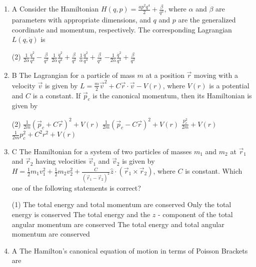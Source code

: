 \begin{enumerate}
	{}
	\item A Consider the Hamiltonian $H(q, p)=\frac{a p^{2} q^{4}}{2}+\frac{\beta}{q^{2}}$, where $\alpha$ and $\beta$ are parameters with appropriate dimensions, and $q$ and $p$ are the generalized coordinate and momentum, respectively. The corresponding Lagrangian $L(q, \dot{q})$ is
{}
	 \begin{tasks}(2)
		\task[\textbf{a.}] $\frac{1}{2 \alpha} \frac{\dot{q}^{2}}{q^{4}}-\frac{\beta}{q^{2}}$
		\task[\textbf{b.}]$\frac{1}{2 \alpha} \frac{\dot{q}^{2}}{q^{4}}+\frac{\beta}{q^{2}}$
		\task[\textbf{c.}]$\frac{1}{\alpha} \frac{\dot{q}^{2}}{q^{4}}+\frac{\beta}{q^{2}}$
		\task[\textbf{d.}] $-\frac{1}{2 \alpha} \frac{\dot{q}^{2}}{q^{4}}+\frac{\beta}{q^{2}}$
	\end{tasks}
	\item B The Lagrangian for a particle of mass $m$ at a position $\vec{r}$ moving with a velocity $\vec{v}$ is given by $L=\frac{m}{2} \vec{v}^{2}+C \vec{r} \cdot \vec{v}-V(r)$, where $V(r)$ is a potential and $C$ is a constant. If $\vec{p}_{c}$ is the canonical momentum, then its Hamiltonian is given by
{}
	 \begin{tasks}(2)
		\task[\textbf{a.}]$\frac{1}{2 m}\left(\vec{p}_{c}+C \vec{r}\right)^{2}+V(r)$
		\task[\textbf{b.}]$\frac{1}{2 m}\left(\vec{p}_{c}-C \vec{r}\right)^{2}+V(r)$
		\task[\textbf{c.}]$\frac{p_{c}^{2}}{2 m}+V(r)$
		\task[\textbf{d.}]  $\frac{1}{2 m} p_{c}^{2}+C^{2} r^{2}+V(r)$
	\end{tasks}
	\item C The Hamiltonian for a system of two particles of masses $m_{1}$ and $m_{2}$ at $\vec{r}_{1}$ and $\vec{r}_{2}$ having velocities $\vec{v}_{1}$ and $\vec{v}_{2}$ is given by $H=\frac{1}{2} m_{1} v_{1}^{2}+\frac{1}{2} m_{2} v_{2}^{2}+\frac{C}{\left(\vec{r}_{1}-\vec{r}_{2}\right)^{2}} \hat{z} \cdot\left(\vec{r}_{1} \times \vec{r}_{2}\right)$, where $C$ is constant. Which one of the following statements is correct?
	{}
	 \begin{tasks}(1)
		\task[\textbf{a.}] The total energy and total momentum are conserved
		\task[\textbf{b.}]Only the total energy is conserved
		\task[\textbf{c.}]The total energy and the $z$ - component of the total angular momentum are conserved
		\task[\textbf{d.}]  The total energy and total angular momentum are conserved
	\end{tasks}
	\item A The Hamilton's canonical equation of motion in terms of Poisson Brackets are

\end{enumerate}

